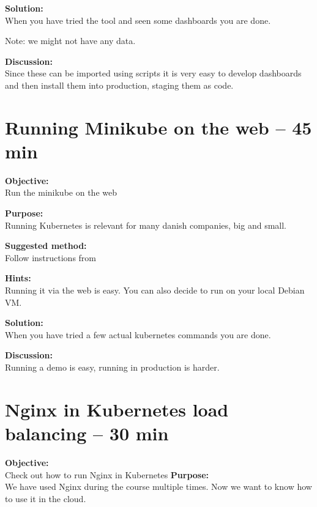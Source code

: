 \documentclass[a4paper,11pt,notitlepage]{report}
\begin{document}
{\bf Solution:}\\
When you have tried the tool and seen some dashboards you are done.

Note: we might not have any data.

{\bf Discussion:}\\
Since these can be imported using scripts it is very easy to develop dashboards and then install them into production, staging them as code.





\chapter{Running Minikube on the web --  45 min}
\label{ex:minikube-web}



{\bf Objective:}\\
Run the minikube on the web

{\bf Purpose:}\\
Running Kubernetes is relevant for many danish companies, big and small.

{\bf Suggested method:}\\
Follow instructions from 

{\bf Hints:}\\
Running it via the web is easy. You can also decide to run on your local Debian VM.

{\bf Solution:}\\
When you have tried a few actual kubernetes commands you are done.

{\bf Discussion:}\\
Running a demo is easy, running in production is harder.


\chapter{Nginx in Kubernetes load balancing -- 30 min}
\label{ex:k8s-nginx-lb}


{\bf Objective:}\\
Check out how to run Nginx in Kubernetes
{\bf Purpose:}\\
We have used Nginx during the course multiple times. Now we want to know how to use it in the cloud.
\end{document}
